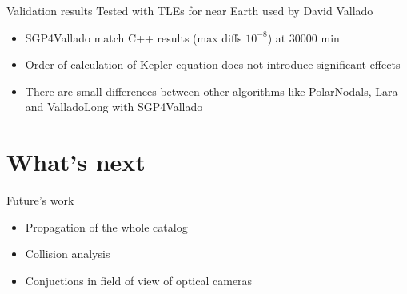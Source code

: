 \documentclass[10pt, compress, xcolor={usenames,dvipsnames}]{beamer}
\newcommand{\SmallArrow}{\ding{228}}
\begin{document}
\begin{frame}[fragile]{Validation results}
Tested with TLEs for near Earth used by David Vallado
  \begin{itemize}[label=\SmallArrow]
    \item SGP4Vallado match C++ results (max diffs $10^{-8}$) at 30000 min
    \item Order of calculation of Kepler equation does not introduce significant effects
    \item There are small differences between other algorithms like PolarNodals, Lara and ValladoLong with SGP4Vallado
  \end{itemize}
\end{frame}

\section{What's next}

\begin{frame}[fragile]{Future's work}
  \begin{itemize}[label=\SmallArrow]
    \item Propagation of the whole catalog
    \item Collision analysis
    \item Conjuctions in field of view of optical cameras
  \end{itemize}
\end{frame}

\end{document}
